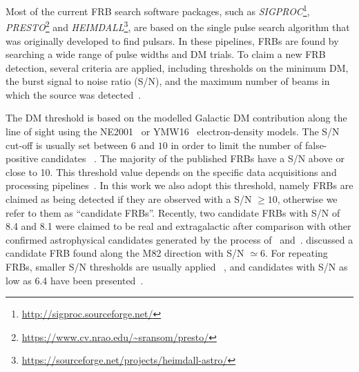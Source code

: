 \documentclass[fleqn,usenatbib]{mnras}
\begin{document}


Most of the current FRB search software packages, such as \emph{\sc SIGPROC}\footnote{\url{http://sigproc.sourceforge.net/}},  \emph{\sc PRESTO}\footnote{\url{https://www.cv.nrao.edu/~sransom/presto/}} \citep[]{presto} and \emph{\sc HEIMDALL}\footnote{\url{https://sourceforge.net/projects/heimdall-astro/}}, are based on the single pulse search algorithm that was originally developed to find pulsars. 
In these pipelines, FRBs are found by searching a wide range of pulse widths and DM trials. 
To claim a new FRB detection, several criteria are applied, including thresholds on the minimum DM, the burst signal to noise ratio (S/N), and the maximum number of beams in which the source was detected~\citep[e.g.][]{Champion16,Bhandari18}. 

The DM threshold is based on the modelled Galactic DM contribution along the line of sight using the NE2001~\citep{Cordes02} or YMW16~\citep{Yao2017} electron-density models. 
The S/N cut-off is usually set between $6$ and $10$ in order to limit the number of false-positive candidates ~\citep{Foster18}. 
The majority of the published FRBs have a S/N above or close to 10.  This threshold value depends on the specific data acquisitions and processing pipelines~\citep{Zhang_2020,Parent20}. 
In this work we also adopt this threshold, namely FRBs are claimed as being detected if they are observed with a S/N $\geq10$, otherwise we refer to them as ``candidate FRBs''. 
Recently, two candidate FRBs with S/N of 8.4 and 8.1 were claimed to be real and extragalactic after comparison with other confirmed astrophysical candidates generated by the process of~\citet{Patel18} and~\citet{Parent20}. \citet{SNlow6} discussed a candidate FRB found along the M82 direction with S/N $\simeq6$.
For repeating FRBs, smaller S/N thresholds are  usually applied ~\citep{Spitler16,Gajjar18,CHIME19_8r}, and candidates with S/N as low as 6.4 have been presented~\citep{Gajjar18}. 
\end{document}
